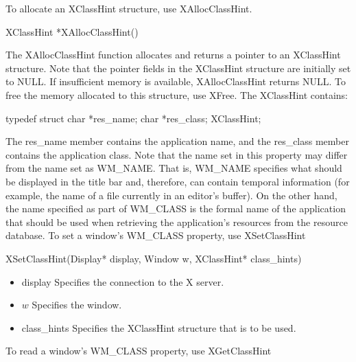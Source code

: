 \documentclass{report}
\begin{document}
\begin{itemize}
\begin{itemize}
            \bigbreak \noindent 
            To allocate an XClassHint structure, use XAllocClassHint.
            \bigbreak \noindent 
            \begin{cppcode}
            XClassHint *XAllocClassHint()
            \end{cppcode}
            \bigbreak \noindent 
            The XAllocClassHint function allocates and returns a pointer to an XClassHint structure. Note that the pointer fields in the XClassHint structure are initially set to NULL. If insufficient memory is available, XAllocClassHint returns NULL. To free the memory allocated to this structure, use XFree.
            \bigbreak \noindent 
            The XClassHint contains:
            \bigbreak \noindent 
            \begin{cppcode}
                typedef struct {
                    char *res_name;
                    char *res_class;
                } XClassHint;
            \end{cppcode}
            \bigbreak \noindent 
            The res\_name member contains the application name, and the res\_class member contains the application class. Note that the name set in this property may differ from the name set as WM\_NAME. That is, WM\_NAME specifies what should be displayed in the title bar and, therefore, can contain temporal information (for example, the name of a file currently in an editor’s buffer). On the other hand, the name specified as part of WM\_CLASS is the formal name of the application that should be used when retrieving the application’s resources from the resource database.
            \bigbreak \noindent 
            To set a window’s WM\_CLASS property, use XSetClassHint
            \bigbreak \noindent 
            \begin{cppcode}
            XSetClassHint(Display* display, Window w, XClassHint* class_hints)
            \end{cppcode}
            \begin{itemize}
                \item display Specifies the connection to the X server.
                \item $w$ Specifies the window.
                \item class\_hints Specifies the XClassHint structure that is to be used.
            \end{itemize}
            To read a window’s WM\_CLASS property, use XGetClassHint
            \bigbreak \noindent 
            \begin{cppcode}

\end{cppcode}
\end{itemize}
\end{itemize}
\end{document}
